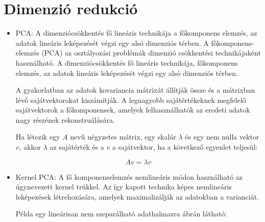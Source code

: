 \section{Dimenzió redukció}
\begin{itemize}
\item PCA: A dimenziócsökkentés\cite{wang2003feature} fő lineáris technikája a főkomponens elemzés, az adatok lineáris leképezését végzi egy alsó dimenziós térben. A főkomponens-elemzés (PCA) az osztályozási problémák dimenzió csökkentési technikájaként használható. A dimenziócsökkentés fő lineáris technikája, főkomponens elemzés, az adatok lineáris leképezését végzi egy alsó dimenziós térben.

A gyakorlatban az adatok kovariancia mátrixát állítják össze és a mátrixban lévő sajátvektorokat kiszámítják. A legnagyobb sajátértékeknek megfelelő sajátvektorok a főkomponensek, amelyek felhasználhatók az eredeti adatok nagy részének rekonstruálására.

Ha létezik egy $A$ nevű négyzetes mátrix, egy skalár $\lambda$ és egy nem nulla vektor $v$, akkor $\lambda$ az sajátérték és a $v$ a sajátvektor, ha a következő egyenlet teljesül:

$$
Av = \lambda v
$$

\item Kernel PCA: A fő komponenselemzés nemlineáris módon használható az úgynevezett kernel trükkel. Az így kapott technika képes nemlineáris leképezések létrehozására, amelyek maximalizálják az adatokban a varianciát.

Példa egy lineárisan nem szeparálható adathalmazra  ábrán látható:


\end{itemize}

